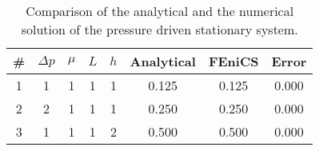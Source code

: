 \begin{table}[hb]
  \label{tab:faen}
  \begin{center}
    \begin{tabular}[width=4in]{|c|c|c|c|c|c|c|c|}
      \hline
      \# & $\Delta p$ & $\mu$ & $L$ & $h$ & Analytical & FEniCS & Error\\ \hline
      1 & 1 & 1 & 1 & 1 & 0.125 & 0.125 & 0.000\\
      2 & 2 & 1 & 1 & 1 & 0.250 & 0.250 & 0.000\\
      3 & 1 & 1 & 1 & 2 & 0.500 & 0.500 & 0.000\\
      \hline
    \end{tabular}
  \caption{Comparison of the analytical and the numerical solution of the pressure driven stationary system.}
  \end{center}

\end{table}